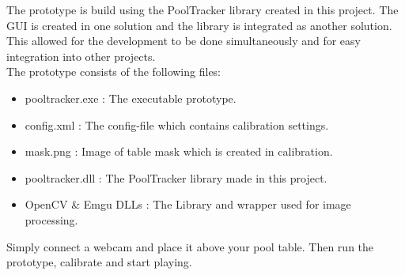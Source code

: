 The prototype is build using the PoolTracker library created in this project. The GUI is created in one solution and the library is integrated as another solution. This allowed for the development to be done simultaneously and for easy integration into other projects.\\

The prototype consists of the following files:
\begin{itemize}
\setlength{\itemsep}{0mm}
	\item pooltracker.exe : The executable prototype.
	\item config.xml	  : The config-file which contains calibration settings.
	\item mask.png		  : Image of table mask which is created in calibration.
	\item pooltracker.dll : The PoolTracker library made in this project.
	\item OpenCV \& Emgu DLLs  : The Library and wrapper used for image processing.
\end{itemize}

Simply connect a webcam and place it above your pool table. Then run the prototype, calibrate and start playing.